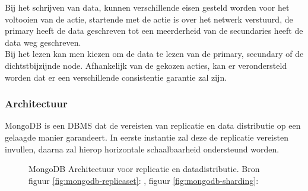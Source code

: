 Bij het schrijven van data, kunnen verschillende eisen gesteld worden voor het voltooien van de actie, startende met de actie is over het netwerk verstuurd, de primary heeft de data geschreven tot een meerderheid van de secundaries heeft de data weg geschreven. \\ Bij het lezen kan men kiezen om de data te lezen van de primary, secundary of de dichtstbijzijnde node. Afhankelijk van de gekozen acties, kan er verondersteld worden dat er een verschillende consistentie garantie zal zijn.

\subsubsection{Architectuur}
MongoDB is een \gls{DBMS} dat de vereisten van replicatie en data distributie op een gelaagde manier garandeert. In eerste instantie zal deze de replicatie vereisten invullen, daarna zal hierop horizontale schaalbaarheid ondersteund worden. 

\begin{figure}[h!] 
\centering
	\hfill
	\caption{MongoDB Architectuur voor replicatie en datadistributie. Bron figuur \ref{fig:mongodb-replicaset}: \cite{mongodb-replicaset}, figuur \ref{fig:mongodb-sharding}: \cite{mongodb-shard}}
	\label{fig:mongodb-architectuur}
\end{figure}

